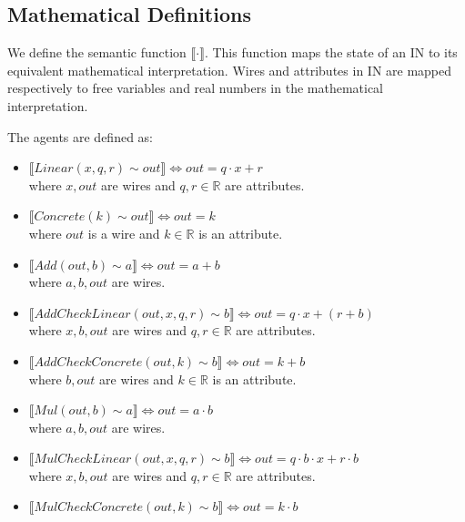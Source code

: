 \subsection{Mathematical Definitions}
\label{sec:mathematical-definitions}

We define the semantic function $\llbracket \cdot \rrbracket$. This function maps the state of an IN
to its equivalent mathematical interpretation. Wires and attributes in IN are mapped respectively to
free variables and real numbers in the mathematical interpretation.

The agents are defined as:
\begin{itemize}
	\item $\llbracket \mathit{Linear}(x, q, r) \sim \mathit{out} \rrbracket \iff \mathit{out} = q \cdot x + r $\\
		where $x, \mathit{out}$ are wires and $q, r \in \mathbb{R}$ are attributes.
	\item $\llbracket \mathit{Concrete}(k) \sim \mathit{out} \rrbracket \iff \mathit{out} = k$\\
		where $\mathit{out}$ is a wire and $k \in \mathbb{R}$ is an attribute.
	\item $\llbracket \mathit{Add}(\mathit{out}, b) \sim a \rrbracket \iff \mathit{out} = a + b$\\
		where $a, b, \mathit{out}$ are wires.
	\item $\llbracket \mathit{AddCheckLinear}(\mathit{out}, x, q, r) \sim b \rrbracket \iff \mathit{out} = q \cdot x + (r + b)$\\
		where $x, b, \mathit{out}$ are wires and $q, r \in \mathbb{R}$ are attributes.
	\item $\llbracket \mathit{AddCheckConcrete}(\mathit{out}, k) \sim b \rrbracket \iff \mathit{out} = k + b$\\
		where $b, \mathit{out}$ are wires and $k \in \mathbb{R}$ is an attribute.
	\item $\llbracket \mathit{Mul}(\mathit{out}, b) \sim a \rrbracket \iff \mathit{out} = a \cdot b$\\
		where $a, b, \mathit{out}$ are wires.
	\item $\llbracket \mathit{MulCheckLinear}(\mathit{out}, x, q, r) \sim b \rrbracket \iff \mathit{out} = q \cdot b \cdot x + r \cdot b$\\
		where $x, b, \mathit{out}$ are wires and $q, r \in \mathbb{R}$ are attributes.
	\item $\llbracket \mathit{MulCheckConcrete}(\mathit{out}, k) \sim b \rrbracket \iff \mathit{out} = k \cdot b$\\

\end{itemize}
